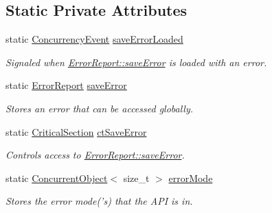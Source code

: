 \subsection*{Static Private Attributes}
\begin{DoxyCompactItemize}
\item 
\hypertarget{class_error_report_abcaa441412d9327a7d7c117e8da8f974}{
static \hyperlink{class_concurrency_event}{ConcurrencyEvent} \hyperlink{class_error_report_abcaa441412d9327a7d7c117e8da8f974}{saveErrorLoaded}}
\label{class_error_report_abcaa441412d9327a7d7c117e8da8f974}

\begin{DoxyCompactList}\small\item\em Signaled when \hyperlink{class_error_report_ac8c302c03f7ed5736f8856fdc6449f36}{ErrorReport::saveError} is loaded with an error. \item\end{DoxyCompactList}\item 
\hypertarget{class_error_report_ac8c302c03f7ed5736f8856fdc6449f36}{
static \hyperlink{class_error_report}{ErrorReport} \hyperlink{class_error_report_ac8c302c03f7ed5736f8856fdc6449f36}{saveError}}
\label{class_error_report_ac8c302c03f7ed5736f8856fdc6449f36}

\begin{DoxyCompactList}\small\item\em Stores an error that can be accessed globally. \item\end{DoxyCompactList}\item 
static \hyperlink{class_critical_section}{CriticalSection} \hyperlink{class_error_report_a9a41fe576d2378b84b31d99cff4adf67}{ctSaveError}
\begin{DoxyCompactList}\small\item\em Controls access to \hyperlink{class_error_report_ac8c302c03f7ed5736f8856fdc6449f36}{ErrorReport::saveError}. \item\end{DoxyCompactList}\item 
static \hyperlink{class_concurrent_object}{ConcurrentObject}$<$ size\_\-t $>$ \hyperlink{class_error_report_ab43384b89b5e0b6addcde53268d3c578}{errorMode}
\begin{DoxyCompactList}\small\item\em Stores the error mode('s) that the API is in. \item\end{DoxyCompactList}\end{DoxyCompactItemize}


